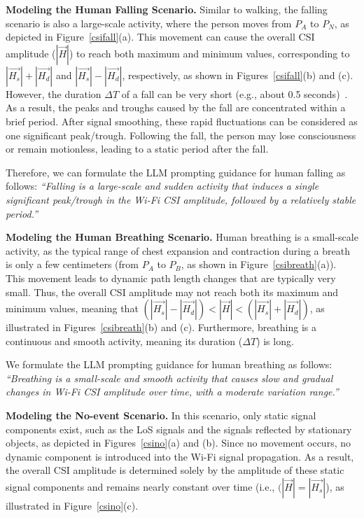




\textbf{Modeling the Human Falling Scenario.} Similar to walking, the falling scenario is also a large-scale activity, where the person moves from $P_A$ to $P_N$, as depicted in Figure~\ref{csifall}(a). This movement can cause the overall CSI amplitude ($|\vec{H}|$) to reach both maximum and minimum values, corresponding to $|\vec{H_s}| + |\vec{H_d}|$ and $|\vec{H_s}| - |\vec{H_d}|$, respectively, as shown in Figures~\ref{csifall}(b) and (c). However, the duration $\Delta T$ of a fall can be very short (e.g., about 0.5 seconds)~\cite{choi2015kinematic}. As a result, the peaks and troughs caused by the fall are concentrated within a brief period. After signal smoothing, these rapid fluctuations can be considered as one significant peak/trough. Following the fall, the person may lose consciousness or remain motionless, leading to a static period after the fall.

Therefore, we can formulate the LLM prompting guidance for human falling as follows:
\emph{``Falling is a large-scale and sudden activity that induces a single significant peak/trough in the Wi-Fi CSI amplitude, followed by a relatively stable period.''}



\textbf{Modeling the Human Breathing Scenario.} Human breathing is a small-scale activity, as the typical range of chest expansion and contraction during a breath is only a few centimeters (from $P_A$ to $P_B$, as shown in Figure~\ref{csibreath}(a)). This movement leads to dynamic path length changes that are typically very small. Thus, the overall CSI amplitude may not reach both its maximum and minimum values, meaning that $(|\vec{H_s}| - |\vec{H_d}|)<|\vec{H}|<(|\vec{H_s}| + |\vec{H_d}|)$, as illustrated in Figures~\ref{csibreath}(b) and (c). Furthermore, breathing is a continuous and smooth activity, meaning its duration ($\Delta T$) is long. 


We formulate the LLM prompting guidance for human breathing as follows:
\emph{``Breathing is a small-scale and smooth activity that causes slow and gradual changes in Wi-Fi CSI amplitude over time, with a moderate variation range.''}


\textbf{Modeling the No-event Scenario.} In this scenario, only static signal components exist, such as the LoS signals and the signals reflected by stationary objects, as depicted in Figures~\ref{csino}(a) and (b). Since no movement occurs, no dynamic component is introduced into the Wi-Fi signal propagation. As a result, the overall CSI amplitude is determined solely by the amplitude of these static signal components and remains nearly constant over time (i.e., $(|\vec{H}|=|\vec{H_s}|$), as illustrated in Figure~\ref{csino}(c).


